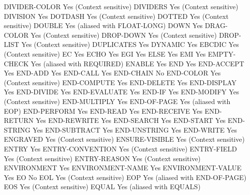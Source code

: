 DIVIDER-COLOR                   Yes (Context sensitive)
DIVIDERS                        Yes (Context sensitive)
DIVISION                        Yes
DOTDASH                         Yes (Context sensitive)
DOTTED                          Yes (Context sensitive)
DOUBLE                          Yes (aliased with FLOAT-LONG)
DOWN                            Yes
DRAG-COLOR                      Yes (Context sensitive)
DROP-DOWN                       Yes (Context sensitive)
DROP-LIST                       Yes (Context sensitive)
DUPLICATES                      Yes
DYNAMIC                         Yes
EBCDIC                          Yes (Context sensitive)
EC                              Yes
ECHO                            Yes
EGI                             Yes
ELSE                            Yes
EMI                             Yes
EMPTY-CHECK                     Yes (aliased with REQUIRED)
ENABLE                          Yes
END                             Yes
END-ACCEPT                      Yes
END-ADD                         Yes
END-CALL                        Yes
END-CHAIN                       No
END-COLOR                       Yes (Context sensitive)
END-COMPUTE                     Yes
END-DELETE                      Yes
END-DISPLAY                     Yes
END-DIVIDE                      Yes
END-EVALUATE                    Yes
END-IF                          Yes
END-MODIFY                      Yes (Context sensitive)
END-MULTIPLY                    Yes
END-OF-PAGE                     Yes (aliased with EOP)
END-PERFORM                     Yes
END-READ                        Yes
END-RECEIVE                     Yes
END-RETURN                      Yes
END-REWRITE                     Yes
END-SEARCH                      Yes
END-START                       Yes
END-STRING                      Yes
END-SUBTRACT                    Yes
END-UNSTRING                    Yes
END-WRITE                       Yes
ENGRAVED                        Yes (Context sensitive)
ENSURE-VISIBLE                  Yes (Context sensitive)
ENTRY                           Yes
ENTRY-CONVENTION                Yes (Context sensitive)
ENTRY-FIELD                     Yes (Context sensitive)
ENTRY-REASON                    Yes (Context sensitive)
ENVIRONMENT                     Yes
ENVIRONMENT-NAME                Yes
ENVIRONMENT-VALUE               Yes
EO                              No
EOL                             Yes (Context sensitive)
EOP                             Yes (aliased with END-OF-PAGE)
EOS                             Yes (Context sensitive)
EQUAL                           Yes (aliased with EQUALS)
